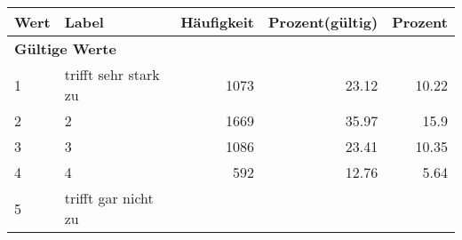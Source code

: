      \begin{longtable}{lXrrr}
     \toprule
     \textbf{Wert} & \textbf{Label} & \textbf{Häufigkeit} & \textbf{Prozent(gültig)} & \textbf{Prozent} \\
     \endhead
     \midrule
     \multicolumn{5}{l}{\textbf{Gültige Werte}}\\

     1 &
     \multicolumn{1}{X}{ trifft sehr stark zu   } &


       \num{1073} &
       \num[round-mode=places,round-precision=2]{23,12} &
         \num[round-mode=places,round-precision=2]{10,22} \\

     2 &
     \multicolumn{1}{X}{ 2   } &


       \num{1669} &
       \num[round-mode=places,round-precision=2]{35,97} &
         \num[round-mode=places,round-precision=2]{15,9} \\

     3 &
     \multicolumn{1}{X}{ 3   } &


       \num{1086} &
       \num[round-mode=places,round-precision=2]{23,41} &
         \num[round-mode=places,round-precision=2]{10,35} \\

     4 &
     \multicolumn{1}{X}{ 4   } &


       \num{592} &
       \num[round-mode=places,round-precision=2]{12,76} &
         \num[round-mode=places,round-precision=2]{5,64} \\

     5 &
     \multicolumn{1}{X}{ trifft gar nicht zu   } &



\end{longtable}
